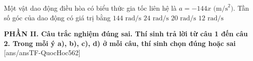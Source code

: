 \begin{ex}%
	Một vật dao động điều hòa có biểu thức gia tốc liên hệ là $a = -144x\text{ (m/s}^2)$. Tần số góc của dao động có giá trị bằng
	\choice
	{$144\text{ rad/s}$}
	{$24\text{ rad/s}$}
	{$20\text{ rad/s}$}
	{\True $12\text{ rad/s}$}
\end{ex}


\noindent \textbf{PHẦN II. Câu trắc nghiệm đúng sai. Thí sinh trả lời từ câu 1 đến câu 2. Trong mỗi ý a), b), c), d) ở mỗi câu, thí sinh chọn đúng hoặc sai}
[ans/ansTF-QuocHoc562]

